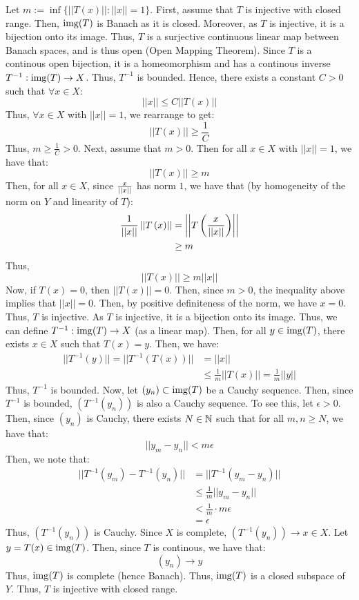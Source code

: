 \documentclass[12pt]{article}
\begin{document}
\begin{solution} 
    Let $m := \inf \{||T(x)|| : ||x|| = 1\}$. \bbni
    First, assume that $T$ is injective with closed range. Then, $\operatorname{img}(T)$ is Banach as it is closed. Moreover, as $T$ is injective, it is a bijection onto its image. Thus, $T$ is a surjective continuous linear map between Banach spaces, and is thus open (Open Mapping Theorem). Since $T$ is a continous open bijection, it is a homeomorphism and has a continous inverse $T^{-1}: \operatorname{img}(T) \to X$. Thus, $T^{-1}$ is bounded. Hence, there exists a constant $C > 0$ such that $\forall x \in X$:
    \[ ||x|| \leq C||T(x)||\]
    Thus, $\forall x \in X$ with $||x|| = 1$, we rearrange to get:
    \[ ||T(x)|| \geq \frac{1}{C}\]
    Thus, $m \geq \frac{1}{C} > 0$. \bbni
    Next, assume that $m > 0$. Then for all $x \in X$ with $||x|| = 1$, we have that: 
    \[ ||T(x)|| \geq m\]
    Then, for all $x \in X$, since $\frac{x}{\left\vert\left\vert x\right\vert\right\vert}$ has norm $1$, we have that (by homogeneity of the norm on $Y$ and linearity of $T$): 
    \begin{align*}
        \frac{1}{\left\vert\left\vert x\right\vert\right\vert}\left\vert\left\vert T\left(x\right)\right\vert\right\vert &= \left\vert\left\vert T\left(\frac{x}{\left\vert\left\vert x\right\vert\right\vert}\right)\right\vert\right\vert \\
        &\geq m 
    \end{align*}   
    Thus, 
    \[||T(x)|| \geq m||x||\]  
    Now, if $T(x) = 0$, then $||T(x)|| = 0$. Then, since $m > 0$, the inequality above implies that $||x|| = 0$. Then, by positive definiteness of the norm, we have $x = 0$. Thus, $T$ is injective. \bbni
    As $T$ is injective, it is a bijection onto its image. Thus, we can define $T^{-1}: \operatorname{img}(T) \to X$ (as a linear map). Then, for all $y \in \operatorname{img}(T)$, there exists $x \in X$ such that $T(x) = y$. Then, we have: 
    \begin{align*}
        ||T^{-1}(y)|| = ||T^{-1}(T(x))|| &= ||x|| \\
        &\leq \frac{1}{m} ||T(x)|| = \frac{1}{m} ||y||
    \end{align*}
    Thus, $T^{-1}$ is bounded. \bbni
    Now, let $(y_n) \subset \operatorname{img}(T)$ be a Cauchy sequence. Then, since $T^{-1}$ is bounded, $(T^{-1}(y_n))$ is also a Cauchy sequence. To see this, let $\epsilon > 0$. Then, since $(y_n)$ is Cauchy, there exists $N \in \mathbb N$ such that for all $m, n \geq N$, we have that: 
    \[ ||y_m - y_n|| < m \epsilon\]
    Then, we note that: 
    \begin{align*}
        ||T^{-1}(y_m) - T^{-1}(y_n)|| &= ||T^{-1}(y_m - y_n)|| \\
        &\leq \frac{1}{m} ||y_m - y_n|| \\
        &< \frac{1}{m} \cdot m\epsilon \\
        &= \epsilon
    \end{align*}
    Thus, $(T^{-1}(y_n))$ is Cauchy. Since $X$ is complete, $(T^{-1}(y_n)) \to x \in X$. Let $y = T(x) \in \operatorname{img}(T)$. Then, since $T$ is continous, we have that: 
    \[ (y_n) \to y\]
    Thus, $\operatorname{img}(T)$ is complete (hence Banach). Thus, $\operatorname{img}(T)$ is a closed subspace of $Y$. Thus, $T$ is injective with closed range.
\end{solution}
\newpage
\end{document}
